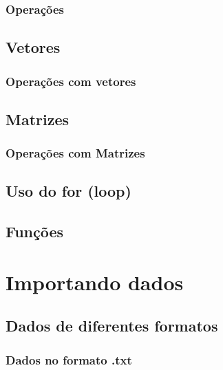 \documentclass[
]{book}
\begin{document}
\hypertarget{operauxe7uxf5es}{%
\subsection{Operações}\label{operauxe7uxf5es}}

\hypertarget{vetores}{%
\section{Vetores}\label{vetores}}

\hypertarget{operauxe7uxf5es-com-vetores}{%
\subsection{Operações com vetores}\label{operauxe7uxf5es-com-vetores}}

\hypertarget{matrizes}{%
\section{Matrizes}\label{matrizes}}

\hypertarget{operauxe7uxf5es-com-matrizes}{%
\subsection{Operações com Matrizes}\label{operauxe7uxf5es-com-matrizes}}

\hypertarget{uso-do-for-loop}{%
\section{Uso do for (loop)}\label{uso-do-for-loop}}

\hypertarget{funuxe7uxf5es}{%
\section{Funções}\label{funuxe7uxf5es}}

\hypertarget{import}{%
\chapter{Importando dados}\label{import}}

\hypertarget{dados-de-diferentes-formatos}{%
\section{Dados de diferentes formatos}\label{dados-de-diferentes-formatos}}

\hypertarget{dados-no-formato-.txt}{%
\subsection{Dados no formato .txt}\label{dados-no-formato-.txt}}
\end{document}
